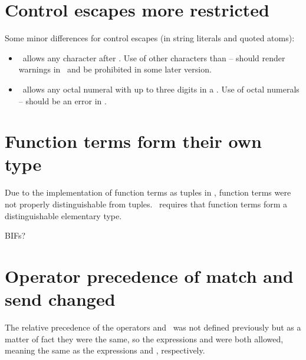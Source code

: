 \section{Control escapes more restricted}

\label{section:new-control-escapes}

Some minor differences for control escapes (in string literals and
quoted atoms):
\begin{itemize}
\item \OldVersion\ allows any character after  .
Use of other characters than --\T{_} should render warnings in
\NewVersion\ and be prohibited in some later version.
\item \OldVersion\ allows any octal numeral with up to three digits in
a . Use of octal numerals -- should be
an error in \NewVersion.
\end{itemize}

\section{Function terms form their own type}

\label{section:new-functions}

Due to the implementation of function terms as tuples in \OldVersion,
function terms were not properly distinguishable from tuples.
\NewVersion\ requires that
function terms form a distinguishable elementary type.

BIFs?

\iffalse
\section{Records form their own type}

\label{section:new-records}

Due to the implementation of records as tuples in \OldVersion,
they were not properly distinguishable.  \NewVersion\ requires that
records form a distinguishable elementary type.

BIFs?
\fi

\section{Operator precedence of match and send changed}

The relative precedence of the operators \T{=} and \T{!}\ was not defined previously but
as a matter of fact they were the same, so the expressions
 and 
were both allowed, meaning the same as the expressions
 and ,
respectively.

